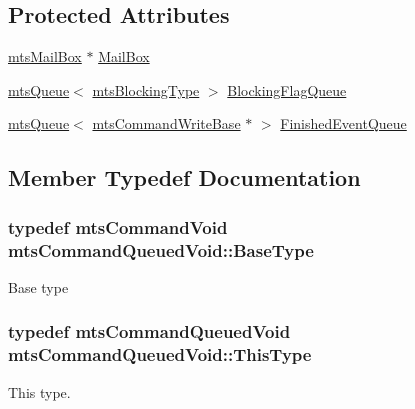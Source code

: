 \subsection*{Protected Attributes}
\begin{DoxyCompactItemize}
\item 
\hyperlink{classmts_mail_box}{mts\-Mail\-Box} $\ast$ \hyperlink{classmts_command_queued_void_a44473994b2785131ab7c0f9974858ff0}{Mail\-Box}
\item 
\hyperlink{classmts_queue}{mts\-Queue}$<$ \hyperlink{mts_forward_declarations_8h_ad7426ccb6c883bc780d0ee197dddcbe7}{mts\-Blocking\-Type} $>$ \hyperlink{classmts_command_queued_void_aefa9eea10dadece42a79902c0e3dc50f}{Blocking\-Flag\-Queue}
\item 
\hyperlink{classmts_queue}{mts\-Queue}$<$ \hyperlink{classmts_command_write_base}{mts\-Command\-Write\-Base} $\ast$ $>$ \hyperlink{classmts_command_queued_void_a292d6fd53236a3143e1182f248d1621d}{Finished\-Event\-Queue}
\end{DoxyCompactItemize}


\subsection{Member Typedef Documentation}
\hypertarget{classmts_command_queued_void_a5e83cb9e30b4d01f5e133d2e809a7379}{
\subsubsection[{Base\-Type}]{\setlength{\rightskip}{0pt plus 5cm}typedef {\bf mts\-Command\-Void} {\bf mts\-Command\-Queued\-Void\-::\-Base\-Type}}}\label{classmts_command_queued_void_a5e83cb9e30b4d01f5e133d2e809a7379}
Base type \hypertarget{classmts_command_queued_void_a2bce402cdb87e0eeff9903a19a48b630}{
\subsubsection[{This\-Type}]{\setlength{\rightskip}{0pt plus 5cm}typedef {\bf mts\-Command\-Queued\-Void} {\bf mts\-Command\-Queued\-Void\-::\-This\-Type}}}\label{classmts_command_queued_void_a2bce402cdb87e0eeff9903a19a48b630}
This type. 

